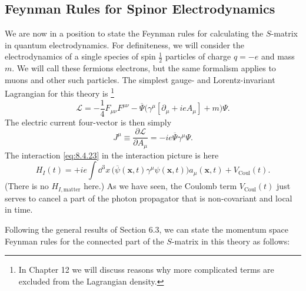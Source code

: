 
\subsection{Feynman Rules for Spinor Electrodynamics}

We are now in a position to state the Feynman rules for calculating the
$S$-matrix in quantum electrodynamics. For definiteness, we will consider the
electrodynamics of a single species of spin $\frac12$ particles of charge
$q=-e$ and mass $m$. We will call these fermions electrons, but the same
formalism applies to muons and other such particles. The simplest gauge- and
Lorentz-invariant Lagrangian for this theory is%
\footnote{In Chapter 12 we will discuss reasons why more complicated terms are
excluded from the Lagrangian density.}
\begin{equation}
\mathcal L=-\frac14F_{\mu\nu}F^{\mu\nu}
-\overline\Psi\bigl(\gamma^\mu[\partial_\mu+ieA_\mu]+m\bigr)\Psi.
\tag{8.6.1}\label{eq:8.6.1}
\end{equation}
The electric current four-vector is then simply
\begin{equation}
J^\mu\equiv\frac{\partial\mathcal L}{\partial A_\mu}
=-ie\overline\Psi\gamma^\mu\Psi.
\tag{8.6.2}\label{eq:8.6.2}
\end{equation}
The interaction \eqref{eq:8.4.23} in the interaction picture is here
\begin{equation}
H_I(t)=+ie\int \dd^3x\,
\bigl(\overline\psi(\mathbf x,t)\gamma^\mu\psi(\mathbf x,t)\bigr)
a_\mu(\mathbf x,t)+V_{\mathrm{Coul}}(t).
\tag{8.6.3}\label{eq:8.6.3}
\end{equation}
(There is no $H_{I,\mathrm{matter}}$ here.) As we have seen, the Coulomb term
$V_{\mathrm{Coul}}(t)$ just serves to cancel a part of the photon propagator
that is non-covariant and local in time.

Following the general results of Section 6.3, we can state the momentum space
Feynman rules for the connected part of the $S$-matrix in this theory as
follows:

